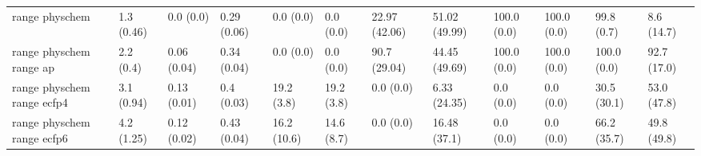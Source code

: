 \begin{tabular}{llllllllllll}
range physchem & {\cellcolor[HTML]{F5FBFD}} \color[HTML]{000000} 1.3 (0.46) & {\cellcolor[HTML]{F7FCFD}} \color[HTML]{000000} 0.0 (0.0) & {\cellcolor[HTML]{82CEB8}} \color[HTML]{000000} 0.29 (0.06) & {\cellcolor[HTML]{F7FCFD}} \color[HTML]{000000} 0.0 (0.0) & {\cellcolor[HTML]{F7FCFD}} \color[HTML]{000000} 0.0 (0.0) & {\cellcolor[HTML]{D1EEE9}} \color[HTML]{000000} 22.97 (42.06) & {\cellcolor[HTML]{63C0A0}} \color[HTML]{000000} 51.02 (49.99) & {\cellcolor[HTML]{00441B}} \color[HTML]{F1F1F1} 100.0 (0.0) & {\cellcolor[HTML]{00441B}} \color[HTML]{F1F1F1} 100.0 (0.0) & {\cellcolor[HTML]{00441B}} \color[HTML]{F1F1F1} 99.8 (0.7) & {\cellcolor[HTML]{EBF7FA}} \color[HTML]{000000} 8.6 (14.7) \\
range physchem range ap & {\cellcolor[HTML]{F4FBFC}} \color[HTML]{000000} 2.2 (0.4) & {\cellcolor[HTML]{F7FCFD}} \color[HTML]{000000} 0.06 (0.04) & {\cellcolor[HTML]{80CDB7}} \color[HTML]{000000} 0.34 (0.04) & {\cellcolor[HTML]{F7FCFD}} \color[HTML]{000000} 0.0 (0.0) & {\cellcolor[HTML]{F7FCFD}} \color[HTML]{000000} 0.0 (0.0) & {\cellcolor[HTML]{006227}} \color[HTML]{F1F1F1} 90.7 (29.04) & {\cellcolor[HTML]{7DCCB5}} \color[HTML]{000000} 44.45 (49.69) & {\cellcolor[HTML]{00441B}} \color[HTML]{F1F1F1} 100.0 (0.0) & {\cellcolor[HTML]{00441B}} \color[HTML]{F1F1F1} 100.0 (0.0) & {\cellcolor[HTML]{00441B}} \color[HTML]{F1F1F1} 100.0 (0.0) & {\cellcolor[HTML]{BAE5DC}} \color[HTML]{000000} 92.7 (17.0) \\
range physchem range ecfp4 & {\cellcolor[HTML]{F3FAFC}} \color[HTML]{000000} 3.1 (0.94) & {\cellcolor[HTML]{F7FCFD}} \color[HTML]{000000} 0.13 (0.01) & {\cellcolor[HTML]{8AD2BE}} \color[HTML]{000000} 0.4 (0.03) & {\cellcolor[HTML]{F7FCFD}} \color[HTML]{000000} 19.2 (3.8) & {\cellcolor[HTML]{F7FCFD}} \color[HTML]{000000} 19.2 (3.8) & {\cellcolor[HTML]{F7FCFD}} \color[HTML]{000000} 0.0 (0.0) & {\cellcolor[HTML]{EEF8FB}} \color[HTML]{000000} 6.33 (24.35) & {\cellcolor[HTML]{00441B}} \color[HTML]{F1F1F1} 0.0 (0.0) & {\cellcolor[HTML]{00441B}} \color[HTML]{F1F1F1} 0.0 (0.0) & {\cellcolor[HTML]{00441B}} \color[HTML]{F1F1F1} 30.5 (30.1) & {\cellcolor[HTML]{00441B}} \color[HTML]{F1F1F1} 53.0 (47.8) \\
range physchem range ecfp6 & {\cellcolor[HTML]{F1FAFC}} \color[HTML]{000000} 4.2 (1.25) & {\cellcolor[HTML]{F7FCFD}} \color[HTML]{000000} 0.12 (0.02) & {\cellcolor[HTML]{75C9AF}} \color[HTML]{000000} 0.43 (0.04) & {\cellcolor[HTML]{F7FCFD}} \color[HTML]{000000} 16.2 (10.6) & {\cellcolor[HTML]{F7FCFD}} \color[HTML]{000000} 14.6 (8.7) & {\cellcolor[HTML]{F7FCFD}} \color[HTML]{000000} 0.0 (0.0) & {\cellcolor[HTML]{DDF2F3}} \color[HTML]{000000} 16.48 (37.1) & {\cellcolor[HTML]{00441B}} \color[HTML]{F1F1F1} 0.0 (0.0) & {\cellcolor[HTML]{00441B}} \color[HTML]{F1F1F1} 0.0 (0.0) & {\cellcolor[HTML]{00441B}} \color[HTML]{F1F1F1} 66.2 (35.7) & {\cellcolor[HTML]{005B25}} \color[HTML]{F1F1F1} 49.8 (49.8) \\

\end{tabular}
